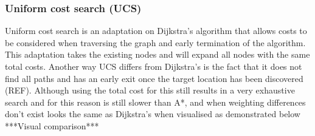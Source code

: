 \subsubsection{Uniform cost search (UCS)}
Uniform cost search is an adaptation on Dijkstra’s algorithm that allows costs to be considered when traversing the graph and early termination of the algorithm. This adaptation takes the existing nodes and will expand all nodes with the same total costs. Another way UCS differs from Dijkstra’s is the fact that it does not find all paths and has an early exit once the target location has been discovered (REF).  Although using the total cost for this still results in a very exhaustive search and for this reason is still slower than A*, and when weighting differences don’t exist looks the same as Dijkstra’s when visualised as demonstrated below
***Visual comparison***
